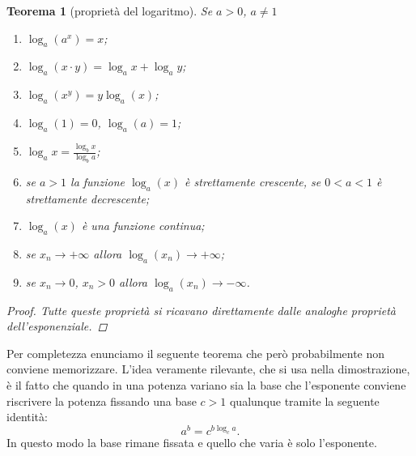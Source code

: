 \documentclass[italian,a4paper,oneside,headinclude]{scrbook}
\newtheorem{theorem}{Teorema}
\begin{document}
\begin{theorem}[proprietà del logaritmo]
Se $a>0$, $a\neq 1$
\begin{enumerate}
  \item $\log_a(a^x) = x$;
  \item $\log_a(x\cdot y)= \log_a x + \log_a y$;
  \item $\log_a(x^y) = y \log_a (x)$;
  \item $\log_a(1) = 0$, $\log_a(a)=1$;
  \item  $\displaystyle  \log_a x = \frac{\log_b x}{\log_b a}$;
  \item se $a>1$ la funzione $\log_a(x)$ è strettamente crescente,
  se $0<a<1$ è strettamente decrescente;
  \item $\log_a(x)$ è una funzione continua;
  \item se $x_n \to +\infty$ allora $\log_a(x_n)\to +\infty$;
  \item se $x_n \to 0$, $x_n>0$ allora $\log_a(x_n)\to -\infty$.
\end{enumerate}
%
\begin{proof}
Tutte queste proprietà si ricavano direttamente dalle analoghe proprietà
dell'esponenziale.
\end{proof}
\end{theorem}

Per completezza enunciamo il seguente teorema che però
probabilmente non conviene memorizzare.
L'idea veramente rilevante, che si usa nella dimostrazione,
è il fatto che quando in una potenza variano sia la base
che l'esponente conviene riscrivere la potenza fissando
una base $c>1$ qualunque
tramite la seguente identità:
\[
  a^b = c^{b \log_c a}.
\]
In questo modo la base rimane fissata e quello
che varia è solo l'esponente.
\end{document}
